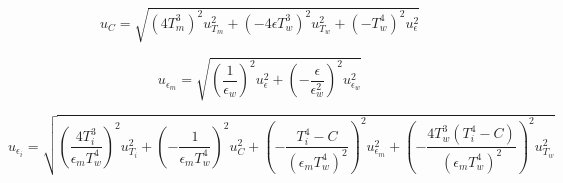 \documentclass[10pt,a4paper,german]{article}
\begin{document}
\begin{equation}
    u_C = \sqrt{\left( 4 T_m^3 \right)^2 u_{T_m}^2 + \left( -4 \epsilon T_w^3 \right)^2 u_{T_w}^2 + \left( -T_w^4 \right)^2  u_{\epsilon}^2} 
\end{equation}

\begin{equation}
    u_{\epsilon_m} = \sqrt{ \left( \frac{1}{\epsilon_w} \right)^2 u_\epsilon^2 + \left( -\frac{\epsilon}{\epsilon_w^2} \right)^2 u_{\epsilon_w}^2}
\end{equation}

\begin{equation}
    u_{\epsilon_i} = \sqrt{ 
        \left( \frac{4 T_i^3}{\epsilon_m T_w^4} \right)^2 u_{T_i}^2 + 
        \left( -\frac{1}{\epsilon_m T_w^4} \right)^2 u_C^2 +
        \left( -\frac{T_i^4 - C}{\left( \epsilon_m T_w^4 \right)^2} \right)^2 u_{\epsilon_m}^2 +
        \left( -\frac{4 T_w^3 \left( T_i^4 - C \right)}{\left( \epsilon_m T_w^4 \right)^2} \right)^2 u_{T_w}^2
      }
\end{equation}
\end{document}
